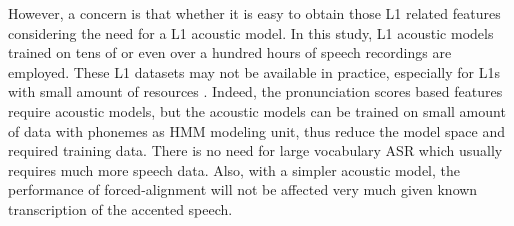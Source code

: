However, a concern is that whether it is easy to obtain those L1 related features considering the need for a L1 acoustic model. In this study, L1 acoustic models trained on tens of or even over a hundred hours of speech recordings are employed. These L1 datasets may not be available in practice, especially for L1s with small amount of resources \citep{gales2017low}. Indeed, the pronunciation scores based features require acoustic models, but the acoustic models can be trained on small amount of data with phonemes as HMM modeling unit, thus reduce the model space and required training data. There is no need for large vocabulary ASR which usually requires much more speech data. Also, with a simpler acoustic model, the performance of forced-alignment will not be affected very much given known transcription of the accented speech.
